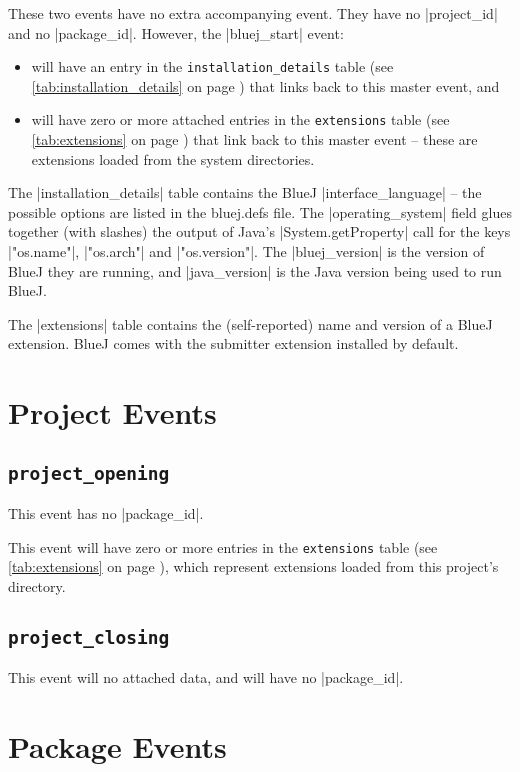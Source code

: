 \documentclass{book}
\newcommand{\myref}[1]{\autoref{#1} on page \pageref*{#1}}
\newcommand{\tabref}[1]{\lstinline|#1| table (see \myref{tab:#1})}
\newcommand{\intern}{When the server comes to add a record to this table with
  duplicate data to a previous record, it might reference the existing
  record instead, to save space.  This is a performance optimisation that should have
  no effect on the semantics.}
\begin{document}
These two events have no extra accompanying event.  They have no
|project_id| and no |package_id|.  However, the |bluej_start| event:

\begin{itemize}
\item will have an entry in the \tabref{installation_details} that links back to this
  master event, and
\item  will have zero or more attached entries in the \tabref{extensions} that link back to this master event
-- these are extensions loaded from
the system directories.
\end{itemize}

The |installation_details| table contains the BlueJ |interface_language| -- the
possible options are listed in the bluej.defs file.  The |operating_system|
field glues together (with slashes) the output of Java's |System.getProperty|
call for the keys |"os.name"|, |"os.arch"| and |"os.version"|.  The
|bluej_version| is the version of BlueJ they are running, and |java_version|
is the Java version being used to run BlueJ.


The |extensions| table contains the (self-reported) name and version of a
BlueJ extension.  BlueJ comes with the submitter extension installed by default.


\section{Project Events}

\subsection{\lstinline|project_opening|}

This event has no |package_id|.

This event will have zero or more entries in the \tabref{extensions}, which
represent extensions loaded from this project's directory.

\subsection{\lstinline|project_closing|}

This event will no attached data, and will have no |package_id|.


\section{Package Events}
\end{document}
